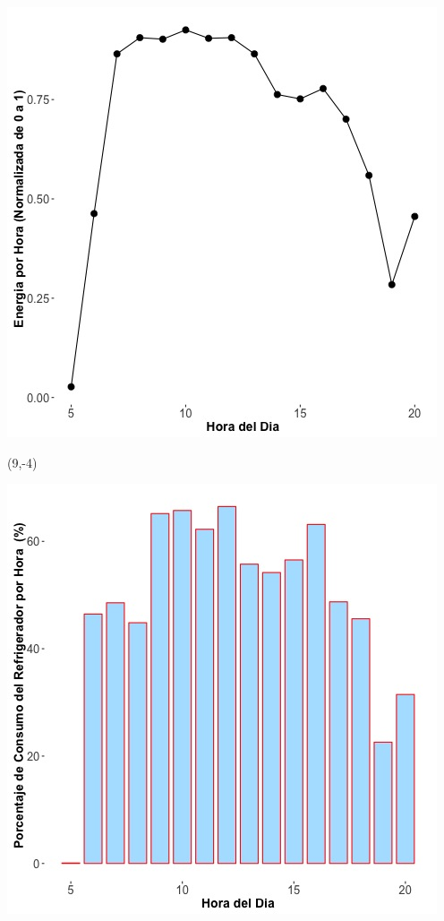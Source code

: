 \documentclass{article}\usepackage[]{graphicx}\usepackage[]{color}
\newenvironment{knitrout}{}{} %
\begin{document}
\begin{knitrout}
\color{fgcolor}
\includegraphics[scale=0.75]{figure/A16_fplot_norm_median} 
\end{knitrout}


 \begin{textblock}{1}(9,-4)
\begin{minipage}{20em}
\begingroup

\endgroup
\end{minipage}
\end{textblock}

 \vspace{2cm}

\begin{knitrout}
\color{fgcolor}
\includegraphics[scale=0.65]{figure/A16_fridge_energy_pct.jpg} 
\end{knitrout}
\end{document}
